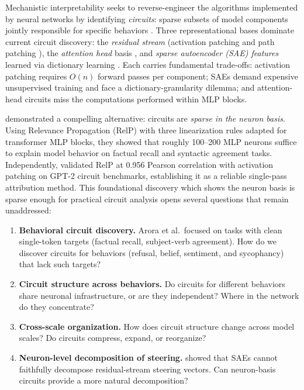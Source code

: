 \documentclass[11pt]{article}
\begin{document}
Mechanistic interpretability seeks to reverse-engineer the algorithms implemented by neural networks by identifying \emph{circuits}: sparse subsets of model components jointly responsible for specific behaviors \citep{conmy2023acdc, wang2023ioi, elhage2022toy}.
Three representational bases dominate current circuit discovery: the \emph{residual stream} (activation patching and path patching \citep{meng2022rome, goldowskydill2023localizing}), the \emph{attention head} basis \citep{wang2023ioi}, and \emph{sparse autoencoder (SAE) features} learned via dictionary learning \citep{cunningham2023sae, bricken2023monosemanticity, templeton2024scaling, marks2024sparse}.
Each carries fundamental trade-offs: activation patching requires $O(n)$ forward passes per component; SAEs demand expensive unsupervised training and face a dictionary-granularity dilemma; and attention-head circuits miss the computations performed within MLP blocks.

\citet{arora2025circuits} demonstrated a compelling alternative: circuits are \emph{sparse in the neuron basis}.
Using Relevance Propagation (RelP) \citep{achtibat2024relp, bach2015pixel} with three linearization rules adapted for transformer MLP blocks, they showed that roughly 100--200 MLP neurons suffice to explain model behavior on factual recall and syntactic agreement tasks.
Independently, \citet{jafari2025relp} validated RelP at 0.956 Pearson correlation with activation patching on GPT-2 circuit benchmarks, establishing it as a reliable single-pass attribution method.
This foundational discovery which shows the neuron basis is sparse enough for practical circuit analysis opens several questions that remain unaddressed:

\begin{enumerate}[leftmargin=2em]
    \item \textbf{Behavioral circuit discovery.} Arora et al.\ focused on tasks with clean single-token targets (factual recall, subject-verb agreement). How do we discover circuits for behaviors (refusal, belief, sentiment, and sycophancy) that lack such targets?

    \item \textbf{Circuit structure across behaviors.} Do circuits for different behaviors share neuronal infrastructure, or are they independent? Where in the network do they concentrate?

    \item \textbf{Cross-scale organization.} How does circuit structure change across model scales? Do circuits compress, expand, or reorganize?

    \item \textbf{Neuron-level decomposition of steering.} \citet{mayne2024sae_steering} showed that SAEs cannot faithfully decompose residual-stream steering vectors. Can neuron-basis circuits provide a more natural decomposition?
\end{enumerate}
\end{document}
